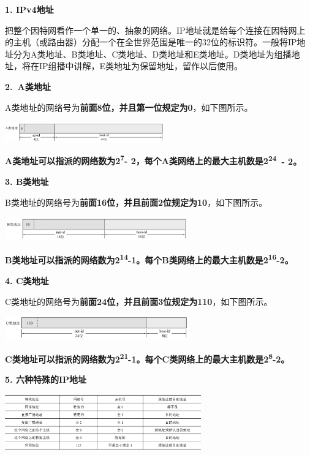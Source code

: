 \textbf{{1. IPv4地址}}

把整个因特网看作一个单一的、抽象的网络。IP地址就是给每个连接在因特网上的主机（或路由器）分配一个在全世界范围是唯一的32位的标识符。一般将IP地址分为A类地址、B类地址、C类地址、D类地址和E类地址。D类地址为组播地址，将在IP组播中讲解，E类地址为保留地址，留作以后使用。

\textbf{{2.~}{A类地址}}

A类地址的网络号为\textbf{{前面8位，并且第一位规定为0}}，如下图所示。

{\includegraphics[width=2.70833in,height=0.33333in]{png-jpeg-pics/1A65DA1BD563DCDF16ECBAEF3C8B8C28.png}}

{{\textbf{A类地址可以指派的网络数为2}}\textsuperscript{{\textbf{7}}}{\textbf{-
2，}}{\textbf{\textbf{每个A类网络上的最大主机数是2}}}}\textsuperscript{{\textbf{24}}}{{\textbf{~-
2}}{\textbf{。}}}

{\textbf{{3. B}{类地址}}\\
}

{B类地址的网络号为\textbf{{前面16位，并且前面2位规定为10}}，如下图所示。}

\includegraphics[width=3.12500in,height=0.40625in]{png-jpeg-pics/EA22F34752120C466F978054181B120D.png}

\textbf{{B类地址可以指派的网络数为2}\textsuperscript{{14}}{-1。每个B类网络上的最大主机数是2}\textsuperscript{{16}}{-2。}{}}

\textbf{\textbf{{4. C}{类地址}}\\
}

C类地址的网络号为\textbf{{前面24位，并且前面3位规定为110}}，如下图所示。

\includegraphics[width=3.12500in,height=0.39583in]{png-jpeg-pics/B14CB902462B4FC67C1283133496374C.png}

{\textbf{C类地址可以指派的网络数为2}}\textsuperscript{{\textbf{21}}}{\textbf{-1。\textbf{{每个C类网络上的最大主机数是}}2}}\textsuperscript{{\textbf{8}}}{\textbf{-2。}}

{\textbf{5. 六种特殊的IP地址}}

{\textbf{\includegraphics[width=3.33333in,height=0.94792in]{png-jpeg-pics/C5C2806E4ECEF23CF1FA33782EB94ECB.png}}}
